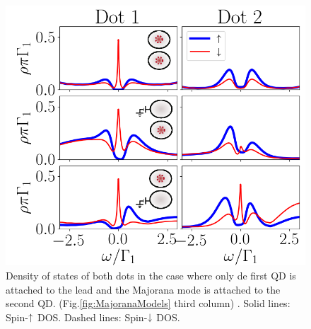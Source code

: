 \documentclass[showpacs,aps,prb,reprint,superscriptaddress]{revtex4-1}
\begin{document}
\begin{figure}[bt]
\begin{center}
\includegraphics[scale=0.45]{Graficos/Nt2>0.png}
\caption{  \label{fig:IndirectMajorana} Density of states of both dots in the case where only de first QD is attached to the lead and the Majorana mode is attached to the second QD.  (Fig.\ref{fig:MajoranaModels} third column) . Solid lines: Spin-$\uparrow$ DOS. Dashed lines: Spin-$\downarrow$ DOS. 
}
%
\label{fig:GenModel}
\end{center}
\end{figure}
 







\end{document}
